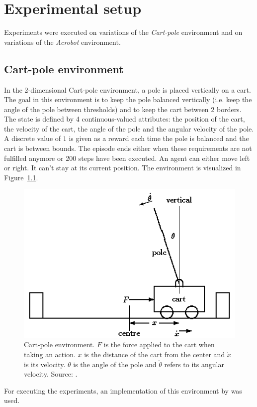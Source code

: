 \chapter{Experimental setup}
Experiments were executed on variations of the \textit{Cart-pole} environment and on variations of the \textit{Acrobot} environment.\\

\section{Cart-pole environment} %
\label{sub:cartpole_environment}
In the 2-dimensional Cart-pole environment, a pole is placed vertically on a cart.
The goal in this environment is to keep the pole balanced vertically (i.e. keep the angle of the pole between thresholds) and to keep the cart between 2 borders.
The state is defined by 4 continuous-valued attributes: the position of the cart, the velocity of the cart, the angle of the pole and the angular velocity of the pole.
A discrete value of $1$ is given as a reward each time the pole is balanced and the cart is between bounds.
The episode ends either when these requirements are not fulfilled anymore or 200 steps have been executed.
An agent can either move left or right. It can't stay at its current position.
The environment is visualized in Figure~\ref{fig:cartpole}.
\begin{figure}[htb]
    \centering
    \includegraphics[width=.6\linewidth]{images/cartpole.png}
    \caption[Cart-pole environment]{Cart-pole environment. $F$ is the force applied to the cart when taking an action. $x$ is the distance of the cart from the center and $\dot{x}$ is its velocity. $\theta$ is the angle of the pole and $\dot{\theta}$ refers to its angular velocity. Source: \cite{grant1990modelling}.}
    \label{fig:cartpole}
\end{figure}
For executing the experiments, an implementation of this environment by \cite{Brockman2016OpenAIGym} was used.\\

